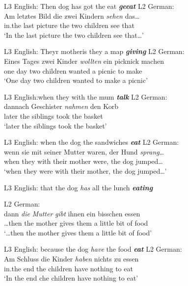 \documentclass[output=paper,modfonts,nonflat, newtxmath]{langsci/langscibook}
\begin{document}
\ea%
  \label{ex:sanchez7:24}
  \begin{xlist}
  	\ex L3 English: Then dog has got the eat \textbf{\textit{geeat}}
  	\ex L2 German:\\
  	\gll Am letztes Bild die zwei Kindern \textit{sehen} das…\\
  	in.the last picture the two children see that\\
  	\glt ‘In the last picture the two children see that…’
  \end{xlist}
\ex %
  \label{ex:sanchez7:25}
  \begin{xlist}
  	\ex L3 English: Theyr mother{is} they a map \textbf{\textit{giving}}
  	\ex L2 German:\\
  	\gll Eines Tages zwei Kinder \textit{wollten} ein picknick machen\\
  	one day two children wanted a picnic {to make}\\
  	\glt ‘One day two children wanted to make a picnic’
  \end{xlist}
\ex%
  \label{ex:sanchez7:26}
  \begin{xlist}
  	\ex L3 English:when they with the mum \textbf{\textit{talk}}
  	\ex L2 German:\\
  	\gll dannach Geschister \textit{nahmen} den Korb\\
  		later {the siblings} took the basket\\
  	\glt ‘later the siblings took the basket’
  \end{xlist}
\ex %
  \label{ex:sanchez7:27}
  \begin{xlist}
  	\ex L3 English: when the dog the sandwiches \textbf{ \textit{eat}}
  	\ex L2 German:\\
  	\gll wenn sie mit seiner Mutter waren, der Hund \textit{sprang}…\\
  		when they with their mother were, the dog jumped…\\
  	\glt ‘when they were with their mother, the dog jumped…’
  \end{xlist}
\ex %
  \label{ex:sanchez7:28}
  \begin{xlist}
  	\ex L3 English: that the dog \textit{has} all the lunch \textbf{\textit{eating}}

  	\ex L2 German:\\
  	\gll {\dots} dann \textit{die} \textit{Mutter} \textit{gibt} ihnen ein bisschen essen\\
  	…then the mother gives them a little bit of food\\
  	\glt ‘…then the mother gives them a little bit of food’
  \end{xlist}
\ex %
  \label{ex:sanchez7:29}
  \begin{xlist}
  	\ex L3 English: because the dog \textit{have} the food \textbf{\textit{eat}}
  	\ex L2 German:\\
  	\gll Am Schluss die Kinder \textit{haben} nichts zu essen\\
   		in.the end the children have nothing to eat\\
  	\glt ‘In the end che children have nothing to eat’
  \end{xlist}
  \z
\end{document}
